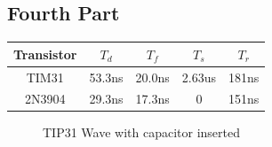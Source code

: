 \documentclass[10pt]{report}
\begin{document}
	\subsection{Fourth Part}
		\begin{center} \begin{tabular}{*{4}{c|}c}
			Transistor & $T_d$ & $T_f$ & $T_s$ & $T_r$ \\ \hline

			TIM31 & 53.3ns & 20.0ns & 2.63us & 181ns \\
			2N3904 & 29.3ns & 17.3ns & 0 & 151ns \\
		\end{tabular} \end{center}
		
		\begin{figure}[H]
			\caption{TIP31 Wave with capacitor inserted}
		\end{figure}
\end{document}
